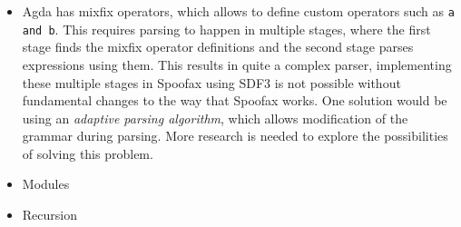 \begin{itemize}
	\item Agda has mixfix operators, which allows to define custom operators such as \verb|a and b|. This requires parsing to happen in multiple stages, where the first stage finds the mixfix operator definitions and the second stage parses expressions using them. This results in quite a complex parser, implementing these multiple stages in Spoofax using SDF3 is not possible without fundamental changes to the way that Spoofax works. One solution would be using an \emph{adaptive parsing algorithm}, which allows modification of the grammar during parsing. More research is needed to explore the possibilities of solving this problem.
	\item Modules
	\item Recursion
\end{itemize}